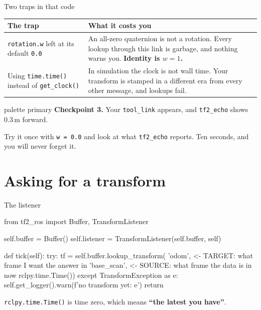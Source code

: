 \documentclass[aspectratio=169]{beamer}
\begin{document}
\begin{frame}{Two traps in that code}
  \small
  \begin{center}
  \begin{tabular}{@{}p{4.3cm}p{6.5cm}@{}}
    \toprule
    \textbf{The trap} & \textbf{What it costs you} \\
    \midrule
    \texttt{rotation.w} left at its default \texttt{0.0}
      & An all-zero quaternion is not a rotation. Every lookup through this link is garbage,
        and nothing warns you. \textbf{Identity is $w=1$.} \\[0.4em]
    Using \texttt{time.time()} instead of \texttt{get\_clock()}
      & In simulation the clock is not wall time. Your transform is stamped in a different
        era from every other message, and lookups fail. \\
    \bottomrule
  \end{tabular}
  \end{center}

  \vspace{0.7em}
  \centering
  \begin{beamercolorbox}[sep=5pt,center,rounded=true]{palette primary}
    \footnotesize \textbf{Checkpoint 3.} Your \texttt{tool\_link} appears, and
    \texttt{tf2\_echo} shows 0.3\,m forward.
  \end{beamercolorbox}

  \vspace{0.3em}
  \footnotesize
  Try it once with \texttt{w = 0.0} and look at what \texttt{tf2\_echo} reports. Ten seconds,
  and you will never forget it.
\end{frame}

\section{Asking for a transform}

\begin{frame}[fragile]{The listener}
  \begin{pycodes}
from tf2_ros import Buffer, TransformListener

self.buffer = Buffer()
self.listener = TransformListener(self.buffer, self)

def tick(self):
    try:
        tf = self.buffer.lookup_transform(
                'odom',          <- TARGET: what frame I want the answer in
                'base_scan',     <- SOURCE: what frame the data is in now
                rclpy.time.Time())
    except TransformException as e:
        self.get_logger().warn(f'no transform yet: {e}')
        return
  \end{pycodes}

  \vspace{0.2em}
  \footnotesize
  \texttt{rclpy.time.Time()} is time zero, which means \textbf{``the latest you have''}.
\end{frame}
\end{document}

